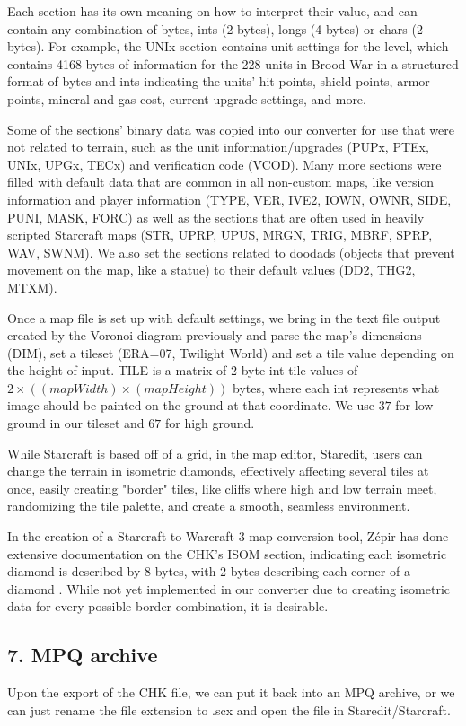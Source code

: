 \documentclass[letterpaper]{article}
\begin{document}
Each section has its own meaning on how to interpret their value, and can contain any combination of bytes, ints (2 bytes), longs (4 bytes) or chars (2 bytes). For example, the UNIx section contains unit settings for the level, which contains 4168 bytes of information for the 228 units in Brood War in a structured format of bytes and ints indicating the units' hit points, shield points, armor points, mineral and gas cost, current upgrade settings, and more.

Some of the sections' binary data was copied into our converter for use that were not related to terrain, such as the unit information/upgrades (PUPx, PTEx, UNIx, UPGx, TECx) and verification code (VCOD). Many more sections were filled with default data that are common in all non-custom maps, like version information and player information (TYPE, VER, IVE2, IOWN, OWNR, SIDE, PUNI, MASK, FORC) as well as the sections that are often used in heavily scripted Starcraft maps (STR, UPRP, UPUS, MRGN, TRIG, MBRF, SPRP, WAV, SWNM). We also set the sections related to doodads (objects that prevent movement on the map, like a statue) to their default values (DD2, THG2, MTXM).

Once a map file is set up with default settings, we bring in the text file output created by the Voronoi diagram previously and parse the map's dimensions (DIM), set a tileset (ERA=07, Twilight World) and set a tile value depending on the height of input. TILE is a matrix of 2 byte int tile values of $2 \times ((mapWidth)  \times (mapHeight))$ bytes, where each int represents what image should be painted on the ground at that coordinate. We use $37$ for low ground in our tileset and $67$ for high ground.

While Starcraft is based off of a grid, in the map editor, Staredit, users can change the terrain in isometric diamonds, effectively affecting several tiles at once, easily creating "border" tiles, like cliffs where high and low terrain meet, randomizing the tile palette, and create a smooth, seamless environment.

In the creation of a Starcraft to Warcraft 3 map conversion tool, Z\'{e}pir has done extensive documentation on the CHK's ISOM section, indicating each isometric diamond is described by 8 bytes, with 2 bytes describing each corner of a diamond \cite{Zepir}. While not yet implemented in our converter due to creating isometric data for every possible border combination, it is desirable.


\subsection{7. MPQ archive}
Upon the export of the CHK file, we can put it back into an MPQ archive, or we can just rename the file extension to .scx and open the file in Staredit/Starcraft.
\end{document}
